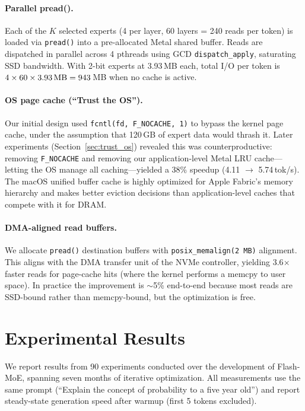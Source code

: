\documentclass[11pt,twocolumn]{article}
\begin{document}
\paragraph{Parallel pread().}
Each of the $K$ selected experts (4 per layer, 60 layers = 240 reads per token) is loaded via \texttt{pread()} into a pre-allocated Metal shared buffer.
Reads are dispatched in parallel across 4 pthreads using GCD \texttt{dispatch\_apply}, saturating SSD bandwidth.
With 2-bit experts at 3.93\,MB each, total I/O per token is $4 \times 60 \times 3.93\text{\,MB} = 943$\,MB when no cache is active.

\paragraph{OS page cache (``Trust the OS'').}
Our initial design used \texttt{fcntl(fd, F\_NOCACHE, 1)} to bypass the kernel page cache, under the assumption that 120\,GB of expert data would thrash it.
Later experiments (Section~\ref{sec:trust_os}) revealed this was counterproductive: removing \texttt{F\_NOCACHE} and removing our application-level Metal LRU cache---letting the OS manage all caching---yielded a 38\% speedup (4.11 $\to$ 5.74\,tok/s).
The macOS unified buffer cache is highly optimized for Apple Fabric's memory hierarchy and makes better eviction decisions than application-level caches that compete with it for DRAM.

\paragraph{DMA-aligned read buffers.}
We allocate \texttt{pread()} destination buffers with \texttt{posix\_memalign(2\,MB)} alignment.
This aligns with the DMA transfer unit of the NVMe controller, yielding 3.6$\times$ faster reads for page-cache hits (where the kernel performs a memcpy to user space).
In practice the improvement is $\sim$5\% end-to-end because most reads are SSD-bound rather than memcpy-bound, but the optimization is free.

\section{Experimental Results}
\label{sec:results}

We report results from 90 experiments conducted over the development of Flash-MoE, spanning seven months of iterative optimization.
All measurements use the same prompt (``Explain the concept of probability to a five year old'') and report steady-state generation speed after warmup (first 5 tokens excluded).
\end{document}

